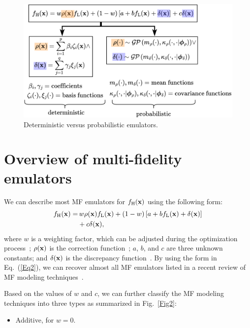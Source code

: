 \documentclass[iicol,sn-basic]{sn-jnl}%
\theoremstyle{thmstyleone}%
\theoremstyle{thmstyletwo}
\theoremstyle{thmstylethree}
\begin{document}
\begin{linenumbers}
\begin{figure}
	\centering
	\includegraphics[scale=0.9]{Fig3.png}
	\caption{Deterministic versus probabilistic emulators.}
	\label{Fig3}
\end{figure}

\section{Overview of multi-fidelity emulators}\label{Sec3}

We can describe most MF emulators for $f_\text{H}({\bf x})$ using the following form:
\begin{equation}\label{Eq2}
	\begin{aligned}
	f_\text{H}({\bf x})= & \, w \rho({\bf x}) f_\text{L}({\bf x}) + (1-w)\left[a + b f_\text{L}({\bf x}) + \delta({\bf x})\right]\\
	& + c \delta({\bf x}),
\end{aligned}
\end{equation}
where $w$ is a weighting factor, which can be adjusted during the optimization process~\citep{Gano2005}; $\rho({\bf {x}})$ is the correction function~\citep{Haftka1991};  $a$, $b$, and $c$ are three unknown constants; and $\delta({\bf{x}})$ is the discrepancy function~\citep{Kennedy2000}.
By using the form in Eq.~(\ref{Eq2}), we can recover almost all MF emulators listed in a recent review of MF modeling techniques~\citep{Godino2016}.

Based on the values of $w$ and $c$, we can further classify the MF modeling techniques into three types as summarized in Fig.~\ref{Fig2}:
\begin{itemize}
    \item Additive, for $w=0$.


\end{itemize}
\end{linenumbers}
\end{document}
